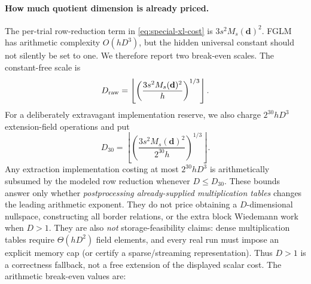 \documentclass[11pt]{article}
\begin{document}
\paragraph{How much quotient dimension is already priced.}
The per-trial row-reduction term in \eqref{eq:special-xl-cost} is
$3s^2M_s(\mathbf d)^2$.  FGLM has arithmetic complexity $O(hD^3)$, but the
hidden universal constant should not silently be set to one.  We therefore
report two break-even scales.  The constant-free scale is
\begin{equation}\label{eq:Dmax}
 D_{\rm raw}
 =\left\lfloor\left(\frac{3s^2M_s(\mathbf d)^2}{h}\right)^{1/3}\right\rfloor.
\end{equation}
For a deliberately extravagant implementation reserve, we also charge
$2^{30}hD^3$ extension-field operations and put
\begin{equation}\label{eq:Dmax-reserve}
 D_{30}
 =\left\lfloor\left(\frac{3s^2M_s(\mathbf d)^2}{2^{30}h}\right)^{1/3}\right\rfloor.
\end{equation}
Any extraction implementation costing at most $2^{30}hD^3$ is arithmetically
subsumed by the modeled row reduction whenever $D\le D_{30}$.  These bounds
answer only whether \emph{postprocessing already-supplied multiplication
tables} changes the leading arithmetic exponent.  They do not price obtaining
a $D$-dimensional nullspace, constructing all border relations, or the extra
block Wiedemann work when $D>1$.  They are also \emph{not} storage-feasibility
claims: dense multiplication tables require $\Theta(hD^2)$ field elements,
and every real run must impose an explicit memory cap (or certify a
sparse/streaming representation).  Thus $D>1$ is a correctness fallback, not
a free extension of the displayed scalar cost.  The arithmetic break-even
values are:
\end{document}
